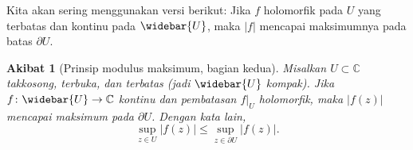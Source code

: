 \documentclass[12pt,openany]{book}
\newcommand{\sabs}[1]{\lvert {#1} \rvert}
\newcommand{\C}{{\mathbb{C}}}
\theoremstyle{plain}
\newtheorem{cor}[thm]{Akibat}
\theoremstyle{remark}
\theoremstyle{definition}
\theoremstyle{exercise}
\theoremstyle{example}
\begin{document}
Kita akan sering menggunakan versi berikut: Jika $f$
holomorfik pada $U$ yang terbatas dan kontinu pada $\widebar{U}$,
maka $\sabs{f}$ mencapai maksimumnya pada batas $\partial U$.

\begin{cor}[Prinsip modulus maksimum, bagian kedua]
\label{cor:maxmodprincpartdeux}
%
%
Misalkan $U \subset \C$ takkosong, terbuka, dan terbatas (jadi $\widebar{U}$ kompak).
Jika $f \colon \widebar{U} \to \C$ kontinu dan pembatasan $f|_{U}$
holomorfik, maka $\sabs{f(z)}$ mencapai maksimum pada $\partial U$.  Dengan
kata lain,
\begin{equation*}
\sup_{z \in U} \sabs{f(z)} \leq
\sup_{z \in \partial U} \sabs{f(z)} .
\end{equation*}
\end{cor}
\end{document}
